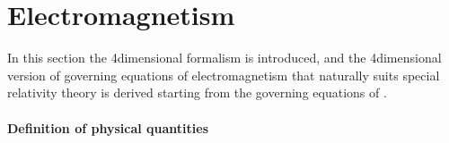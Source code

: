 \documentclass[letterpaper,10pt,english]{jupyterBook}
\begin{document}
\sphinxstepscope


\chapter{Electromagnetism}
\label{\detokenize{ch/relativity-special/em:electromagnetism}}\label{\detokenize{ch/relativity-special/em:relativity-special-em}}\label{\detokenize{ch/relativity-special/em::doc}}
\sphinxAtStartPar
{} In this section the 4\sphinxhyphen{}dimensional formalism is introduced, and the 4\sphinxhyphen{}dimensional version of governing equations of electromagnetism that naturally suits special relativity theory is derived starting from the governing equations of .
\subsubsection*{Definition of physical quantities}
\end{document}
